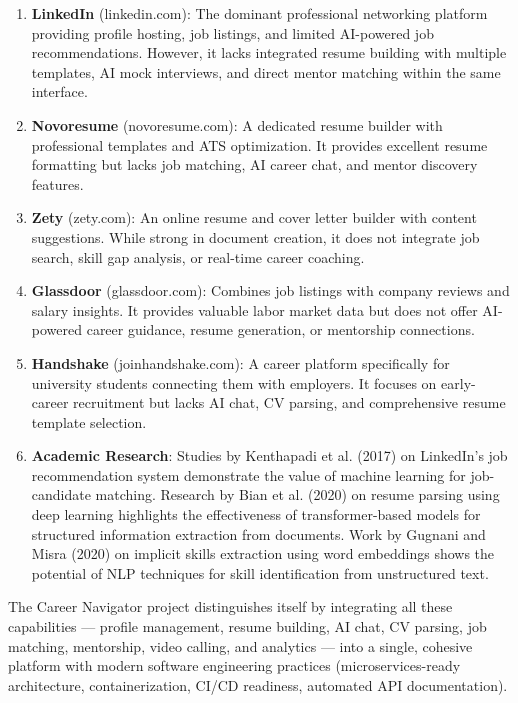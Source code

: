 \documentclass[12pt,a4paper]{report}
\begin{document}
\begin{enumerate}[label=\textbf{L-\arabic*}:, leftmargin=*]
    \item \textbf{LinkedIn} (linkedin.com): The dominant professional networking platform providing profile hosting, job listings, and limited AI-powered job recommendations. However, it lacks integrated resume building with multiple templates, AI mock interviews, and direct mentor matching within the same interface.
    
    \item \textbf{Novoresume} (novoresume.com): A dedicated resume builder with professional templates and ATS optimization. It provides excellent resume formatting but lacks job matching, AI career chat, and mentor discovery features.
    
    \item \textbf{Zety} (zety.com): An online resume and cover letter builder with content suggestions. While strong in document creation, it does not integrate job search, skill gap analysis, or real-time career coaching.
    
    \item \textbf{Glassdoor} (glassdoor.com): Combines job listings with company reviews and salary insights. It provides valuable labor market data but does not offer AI-powered career guidance, resume generation, or mentorship connections.
    
    \item \textbf{Handshake} (joinhandshake.com): A career platform specifically for university students connecting them with employers. It focuses on early-career recruitment but lacks AI chat, CV parsing, and comprehensive resume template selection.
    
    \item \textbf{Academic Research}: Studies by Kenthapadi et al. (2017) on LinkedIn's job recommendation system demonstrate the value of machine learning for job-candidate matching. Research by Bian et al. (2020) on resume parsing using deep learning highlights the effectiveness of transformer-based models for structured information extraction from documents. Work by Gugnani and Misra (2020) on implicit skills extraction using word embeddings shows the potential of NLP techniques for skill identification from unstructured text.
\end{enumerate}

The Career Navigator project distinguishes itself by integrating all these capabilities — profile management, resume building, AI chat, CV parsing, job matching, mentorship, video calling, and analytics — into a single, cohesive platform with modern software engineering practices (microservices-ready architecture, containerization, CI/CD readiness, automated API documentation).
\end{document}
